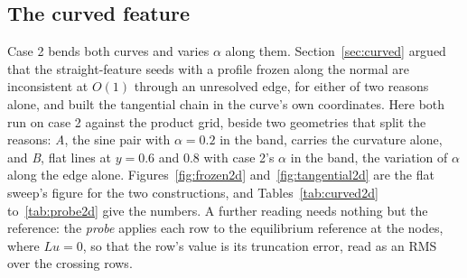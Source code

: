 \documentclass[11pt]{amsart}
\theoremstyle{definition}
\theoremstyle{remark}
\begin{document}
\subsection{The curved feature}
\label{sec:curved2d}
Case 2 bends both curves and varies $\alpha$ along them.
Section~\ref{sec:curved} argued that the straight-feature seeds with a
profile frozen along the normal are inconsistent at $O(1)$ through an
unresolved edge, for either of two reasons alone, and built the tangential
chain in the curve's own coordinates. Here both run on case 2 against the
product grid, beside two geometries that split the reasons: \emph{A}, the
sine pair with $\alpha = 0.2$ in the band, carries the curvature alone, and
\emph{B}, flat lines at $y = 0.6$ and $0.8$ with case 2's $\alpha$ in the
band, the variation of $\alpha$ along the edge alone.
Figures~\ref{fig:frozen2d} and~\ref{fig:tangential2d} are the flat sweep's
figure for the two constructions, and Tables~\ref{tab:curved2d}
to~\ref{tab:probe2d} give the numbers. A further reading needs nothing but the
reference: the \emph{probe} applies each row to the equilibrium reference at
the nodes, where $L u = 0$, so that the row's value is its truncation error,
read as an RMS over the crossing rows.
\end{document}
